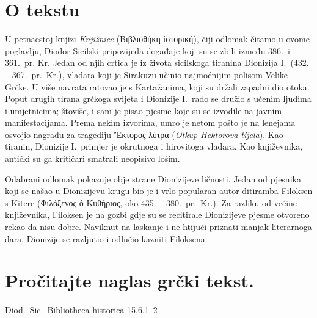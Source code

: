 


\section*{O tekstu}

U petnaestoj knjizi \textit{Knjižnice} \textgreek[variant=ancient]{(Βιβλιοθήκη ἱστορική),} čiji odlomak čitamo u ovome poglavlju, Diodor Sicilski pripovijeda događaje koji su se zbili između 386.\ i 361.\ pr. Kr. Jedan od njih crtica je iz života sicilskoga tiranina Dionizija I.\ (432. – 367.\ pr.~Kr.), vladara koji je Sirakuzu učinio najmoćnijim polisom Velike Grčke. U više navrata ratovao je s Kartažanima, koji su držali zapadni dio otoka. Poput drugih tirana grčkoga svijeta i Dionizije I.\ rado se družio s učenim ljudima i umjetnicima; štoviše, i sam je pisao pjesme koje su se izvodile na javnim manifestacijama. Prema nekim izvorima, umro je netom pošto je na lenejama osvojio nagradu za tragediju \textgreek[variant=ancient]{Ἕκτορος λύτρα} (\textit{Otkup Hektorova tijela}). Kao tiranin, Dionizije I.\ primjer je okrutnoga i hirovitoga vladara. Kao književnika, antički su ga kritičari smatrali neopisivo lošim.
 
Odabrani odlomak pokazuje obje strane Dionizijeve ličnosti. Jedan od pjesnika koji se našao u Dionizijevu krugu bio je i vrlo popularan autor ditiramba Filoksen s Kitere (\textgreek[variant=ancient]{Φιλόξενος ὁ Κυθήριος,} oko 435. – 380.\ pr.~Kr.). Za razliku od većine književnika, Filoksen je na gozbi gdje su se recitirale Dionizijeve pjesme otvoreno rekao da nisu dobre. Naviknut na laskanje i ne htijući priznati manjak literarnoga dara, Dionizije se razljutio i odlučio kazniti Filoksena.

\newpage

\section*{Pročitajte naglas grčki tekst.}

Diod.~Sic.\ Bibliotheca historica 15.6.1–2


\medskip


